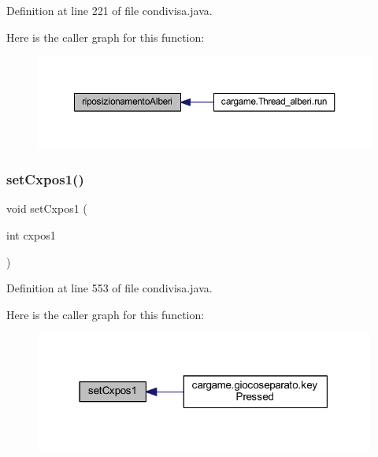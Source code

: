 Definition at line 221 of file condivisa.\+java.

Here is the caller graph for this function\+:
\nopagebreak
\begin{figure}[H]
\begin{center}
\leavevmode
\includegraphics[width=350pt]{classcargame_1_1condivisa_ad8fe09dd7b1a7984263e49555b38e19d_icgraph}
\end{center}
\end{figure}
\mbox{\label{classcargame_1_1condivisa_a51e9c9ff9a30c46c20bcb013e5bc02f8}} 
\subsubsection{\texorpdfstring{set\+Cxpos1()}{setCxpos1()}}
{\footnotesize\ttfamily void set\+Cxpos1 (\begin{DoxyParamCaption}\item[{int}]{cxpos1 }\end{DoxyParamCaption})}



Definition at line 553 of file condivisa.\+java.

Here is the caller graph for this function\+:
\nopagebreak
\begin{figure}[H]
\begin{center}
\leavevmode
\includegraphics[width=316pt]{classcargame_1_1condivisa_a51e9c9ff9a30c46c20bcb013e5bc02f8_icgraph}
\end{center}
\end{figure}
\mbox{\label{classcargame_1_1condivisa_ace31301facdef5d53bd698061a4805ff}} 
